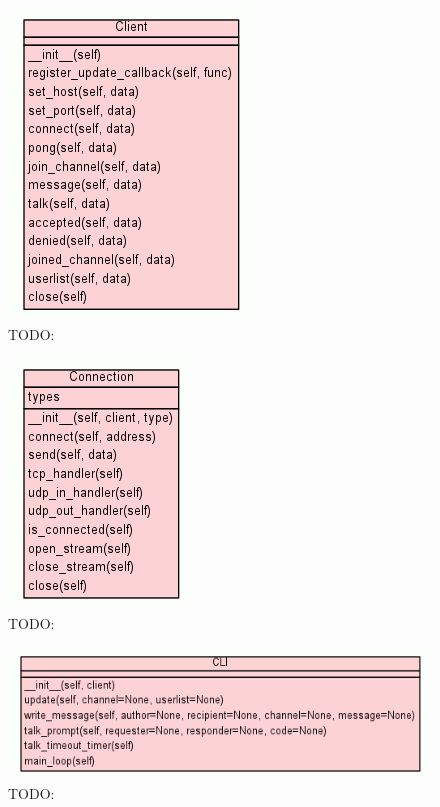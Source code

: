 \documentclass[12pt]{rapport}
\begin{document}
\begin{figure}[H]
  \begin{center}
    \includegraphics[scale=0.9]{../uml/uml_class_diagram_for_voix_cli}
    \caption{TODO:}
  \end{center}
\end{figure}
\begin{figure}[H]
  \begin{center}
    \includegraphics[scale=0.9]{../uml/uml_class_diagram_for_voix_con}
    \caption{TODO:}
  \end{center}
\end{figure}
\begin{figure}[H]
  \begin{center}
    \includegraphics[scale=0.9]{../uml/uml_class_diagram_for_voix_int}
    \caption{TODO:}
  \end{center}
\end{figure}
\end{document}
